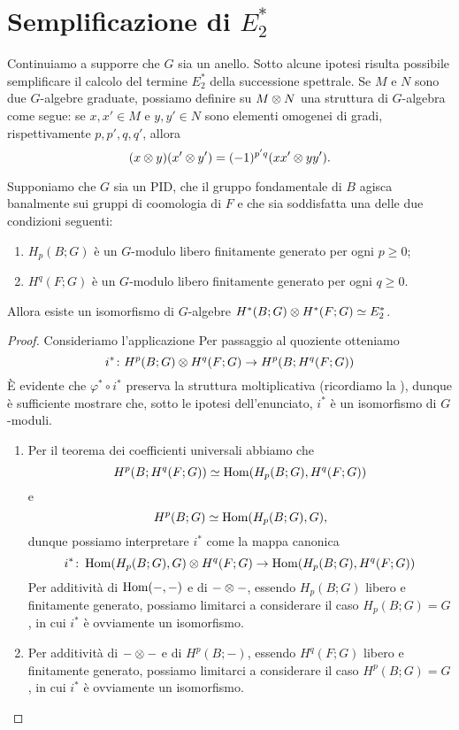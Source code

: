 \section{Semplificazione di \texorpdfstring{$E^*_2$}{E*2}}
Continuiamo a supporre che $G$ sia un anello. Sotto alcune ipotesi risulta possibile semplificare il calcolo del termine $E^\ast_2$ della successione spettrale. Se $M$ e $N$ sono due $G$-algebre graduate, possiamo definire su $M\mathbin{\otimes} N$ una struttura di $G$-algebra come segue: se $x,x'\in M$ e $y,y'\in N$ sono elementi omogenei di gradi, rispettivamente $p,p',q,q'$, allora
$$
(x\mathbin{\otimes} y)(x'\mathbin{\otimes} y')=(-1)^{p'q}(xx'\mathbin{\otimes} yy').
$$
\begin{proposition}
Supponiamo che $G$ sia un PID, che il gruppo fondamentale di $B$ agisca banalmente sui gruppi di coomologia di $F$ e che sia soddisfatta una delle due condizioni seguenti:
\begin{enumerate}
\item $H_p(B;G)$ è un $G$-modulo libero finitamente generato per ogni $p\ge 0$;
\item $H^q(F;G)$ è un $G$-modulo libero finitamente generato per ogni $q\ge 0$.
\end{enumerate}
Allora esiste un isomorfismo di $G$-algebre $H^*(B;G)\mathbin{\otimes} H^*(F;G)\simeq E^\ast_2$.
\end{proposition}
\begin{proof}
Consideriamo l'applicazione
Per passaggio al quoziente otteniamo
$$
i^*\colon H^p(B;G)\mathbin{\otimes} H^q(F;G)\to H^p(B;H^q(F;G))
$$
È evidente che $\varphi^*\circ i^*$ preserva la struttura moltiplicativa (ricordiamo la ), dunque è sufficiente mostrare che, sotto le ipotesi dell'enunciato, $i^*$ è un isomorfismo di $G$-moduli.
\begin{enumerate}
\item Per il teorema dei coefficienti universali abbiamo che
$$
H^p(B;H^q(F;G))\simeq\operatorname{Hom}(H_p(B;G),H^q(F;G))
$$
e
$$
H^p(B;G)\simeq\operatorname{Hom}(H_p(B;G),G),
$$
dunque possiamo interpretare $i^*$ come la mappa canonica
$$
i^*\colon\operatorname{Hom}(H_p(B;G),G)\mathbin{\otimes} H^q(F;G)\to\operatorname{Hom}(H_p(B;G),H^q(F;G))
$$
Per additività di $\operatorname{Hom}(-,-)$ e di $-\mathbin{\otimes}-$, essendo $H_p(B;G)$ libero e finitamente generato, possiamo limitarci a considerare il caso $H_p(B;G)=G$, in cui $i^*$ è ovviamente un isomorfismo.
\item Per additività di $-\mathbin{\otimes}-$ e di $H^p(B;-)$, essendo $H^q(F;G)$ libero e finitamente generato, possiamo limitarci a considerare il caso $H^p(B;G)=G$, in cui $i^*$ è ovviamente un isomorfismo.
\end{enumerate}
\end{proof}

